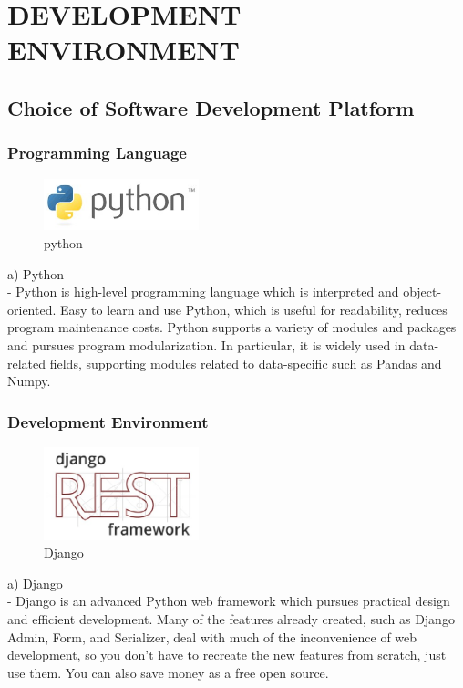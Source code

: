 \documentclass[conference]{IEEEtran}
\begin{document}
\section{DEVELOPMENT ENVIRONMENT}
\subsection{Choice of Software Development Platform}
\subsubsection{Programming Language}
\begin{figure}[!htbp]
\centering
    \includegraphics[width =4.5cm]{pictures/python}
    \hfil
\caption{python}
\label{python}
\end{figure}

{a)	Python\\
-	Python is high-level programming language which is interpreted and object-oriented. Easy to learn and use Python, which is useful for readability, reduces program maintenance costs. Python supports a variety of modules and packages and pursues program modularization. In particular, it is widely used in data-related fields, supporting modules related to data-specific such as Pandas and Numpy.}

\subsubsection{Development Environment}

\begin{figure}[!htbp]
\centering
    \includegraphics[width =4.5cm]{pictures/django}
    \hfil
\caption{Django}
\end{figure}
a)	Django\\

-	Django is an advanced Python web framework which pursues practical design and efficient development. Many of the features already created, such as Django Admin, Form, and Serializer, deal with much of the inconvenience of web development, so you don't have to recreate the new features from scratch, just use them. You can also save money as a free open source.
\end{document}
